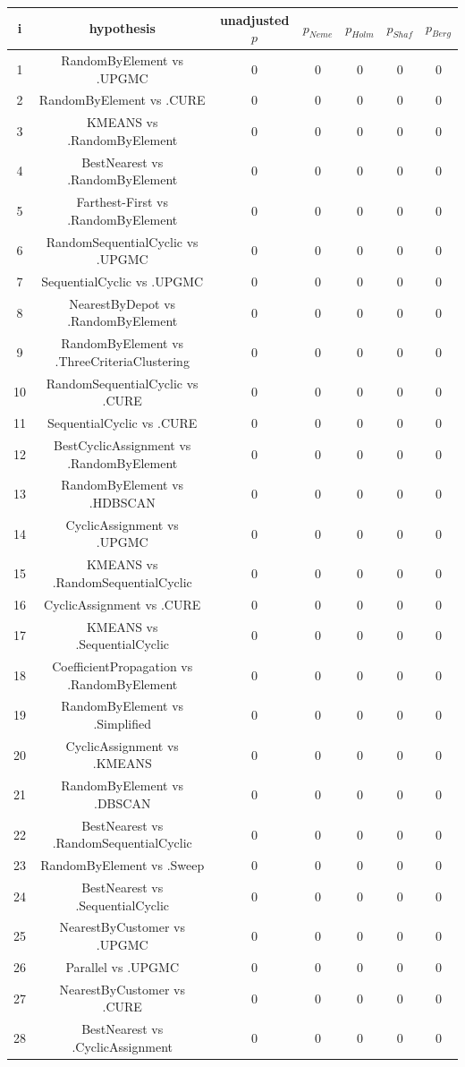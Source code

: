 \documentclass[a4paper,10pt]{article}
\begin{document}
\begin{landscape}
\begin{table}[!htp]
\centering\scriptsize
\begin{tabular}{ccccccc}
i&hypothesis&unadjusted $p$&$p_{Neme}$&$p_{Holm}$&$p_{Shaf}$&$p_{Berg}$\\
\hline1&RandomByElement vs .UPGMC&0&0&0&0&0\\
2&RandomByElement vs .CURE&0&0&0&0&0\\
3&KMEANS vs .RandomByElement&0&0&0&0&0\\
4&BestNearest vs .RandomByElement&0&0&0&0&0\\
5&Farthest-First vs .RandomByElement&0&0&0&0&0\\
6&RandomSequentialCyclic vs .UPGMC&0&0&0&0&0\\
7&SequentialCyclic vs .UPGMC&0&0&0&0&0\\
8&NearestByDepot vs .RandomByElement&0&0&0&0&0\\
9&RandomByElement vs .ThreeCriteriaClustering&0&0&0&0&0\\
10&RandomSequentialCyclic vs .CURE&0&0&0&0&0\\
11&SequentialCyclic vs .CURE&0&0&0&0&0\\
12&BestCyclicAssignment vs .RandomByElement&0&0&0&0&0\\
13&RandomByElement vs .HDBSCAN&0&0&0&0&0\\
14&CyclicAssignment vs .UPGMC&0&0&0&0&0\\
15&KMEANS vs .RandomSequentialCyclic&0&0&0&0&0\\
16&CyclicAssignment vs .CURE&0&0&0&0&0\\
17&KMEANS vs .SequentialCyclic&0&0&0&0&0\\
18&CoefficientPropagation vs .RandomByElement&0&0&0&0&0\\
19&RandomByElement vs .Simplified&0&0&0&0&0\\
20&CyclicAssignment vs .KMEANS&0&0&0&0&0\\
21&RandomByElement vs .DBSCAN&0&0&0&0&0\\
22&BestNearest vs .RandomSequentialCyclic&0&0&0&0&0\\
23&RandomByElement vs .Sweep&0&0&0&0&0\\
24&BestNearest vs .SequentialCyclic&0&0&0&0&0\\
25&NearestByCustomer vs .UPGMC&0&0&0&0&0\\
26&Parallel vs .UPGMC&0&0&0&0&0\\
27&NearestByCustomer vs .CURE&0&0&0&0&0\\
28&BestNearest vs .CyclicAssignment&0&0&0&0&0\\

\end{tabular}
\end{table}
\end{landscape}
\end{document}
